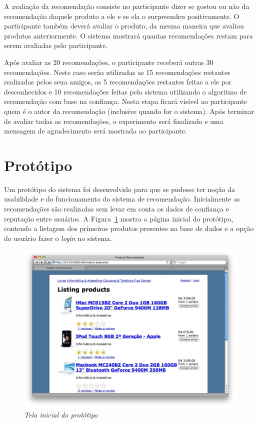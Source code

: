  A avaliação da recomendação consiste no participante dizer se gostou ou não da recomendação daquele produto a ele e se ela o surpreendeu positivamente. O participante também deverá avaliar o produto, da mesma maneira que avaliou produtos anteriormente. O sistema mostrará quantas recomendações restam para serem avaliadas pelo participante.
 
 Após avaliar as 20 recomendações, o participante receberá outras 30 recomendações. Neste caso serão utilizadas as 15 recomendações restantes realizadas pelos seua amigos, as 5 recomendações restantes feitas a ele por desconhecidos e 10 recomendações feitas pelo sistema utilizando o algoritmo de recomendação com base na confiança. Nesta etapa ficará visível ao participante quem é o autor da recomendação (inclusive quando for o sistema). Após terminar de avaliar todas as recomendações, o experimento será finalizado e uma mensagem de agradecimento será mostrada ao participante.
 
 \section{Protótipo}
 \label{cha:prototipo}

 Um protótipo do sistema foi desenvolvido para que se pudesse ter noção da usabilidade e do funcionamento do sistema de recomendação. Inicialmente as recomendações são realizadas sem levar em conta os dados de confiança e reputação entre usuários. A Figura~\ref{fig:tela_inicial_prototipo} mostra a página inicial do protótipo, contendo a listagem dos primeiros produtos presentes na base de dados e a opção do usuário fazer o \textit{login} no sistema.
 
\begin{figure}
  \centering
  \includegraphics[width=\textwidth]{imagens/Tela_Inicial_Prototipo}
  \caption{\it Tela inicial do protótipo}
  \label{fig:tela_inicial_prototipo}
\end{figure}

